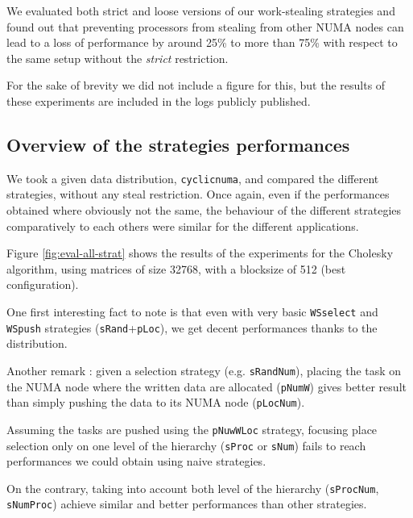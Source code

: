 \documentclass{Styles/llncs}
\begin{document}
We evaluated both strict and loose versions of our work-stealing strategies and found
out that preventing processors from stealing from other NUMA nodes can lead to a loss of performance by
around 25\% to more than 75\% with respect to the same setup without the \emph{strict}
restriction.

For the sake of brevity we did not include a figure for this, but the results of these
experiments are included in the logs publicly published.




\subsection{Overview of the strategies performances}

We took a given data distribution, \verb/cyclicnuma/, and compared the
different strategies, without any steal restriction.
Once again, even if the performances obtained where obviously not the same, the behaviour
of the different strategies comparatively to each others were similar for the
different applications.

Figure \ref{fig:eval-all-strat} shows the results of the experiments for the
Cholesky algorithm, using matrices of size 32768, with a blocksize of 512 (best configuration).


One first interesting fact to note is that even with very basic \verb/WSselect/
and \verb/WSpush/ strategies (\verb/sRand/+\verb/pLoc/), we get decent performances
thanks to the distribution.

Another remark : given a selection strategy (e.g. \verb/sRandNum/), placing
the task on the NUMA node where the written data are allocated (\verb/pNumW/) gives
better result than simply pushing the data to its NUMA node (\verb/pLocNum/).

Assuming the tasks are pushed using the \verb/pNuwWLoc/ strategy, focusing
place selection only on one level of the hierarchy (\verb/sProc/ or \verb/sNum/)
fails to reach performances we could obtain using naive strategies.

On the contrary, taking into account both level of the hierarchy (\verb/sProcNum/,
\verb/sNumProc/) achieve similar and better performances than other strategies.
\end{document}

